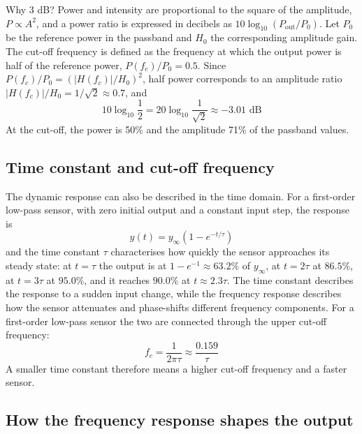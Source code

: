 \documentclass[letterpaper,11pt,leqno]{book}
\begin{document}
Why 3 dB? Power and intensity are proportional to the square of the amplitude, $P \propto A^2$, and a power ratio is expressed in decibels as $10\log_{10}(P_{\text{out}}/P_0)$. Let $P_0$ be the reference power in the passband and $H_0$ the corresponding amplitude gain. The cut-off frequency is defined as the frequency at which the output power is half of the reference power, $P(f_c)/P_0 = 0.5$. Since $P(f_c)/P_0 = (|H(f_c)|/H_0)^2$, half power corresponds to an amplitude ratio $|H(f_c)|/H_0 = 1/\sqrt{2} \approx 0.7$, and
\begin{equation}
\boxed{10\log_{10}\frac{1}{2} = 20\log_{10}\frac{1}{\sqrt{2}} \approx -3.01\text{ dB}}
\label{eq:minus_3db_derivation}
\end{equation}
At the cut-off, the power is 50\% and the amplitude 71\% of the passband values.

\subsection{Time constant and cut-off frequency}

The dynamic response can also be described in the time domain. For a first-order low-pass sensor, with zero initial output and a constant input step, the response is
\begin{equation}
\boxed{y(t) = y_\infty\left(1 - e^{-t/\tau}\right)}
\label{eq:step_response_yinf}
\end{equation}
and the time constant $\tau$ characterises how quickly the sensor approaches its steady state: at $t = \tau$ the output is at $1 - e^{-1} \approx 63.2\%$ of $y_\infty$, at $t = 2\tau$ at $86.5\%$, at $t = 3\tau$ at $95.0\%$, and it reaches $90.0\%$ at $t \approx 2.3\tau$. The time constant describes the response to a sudden input change, while the frequency response describes how the sensor attenuates and phase-shifts different frequency components. For a first-order low-pass sensor the two are connected through the upper cut-off frequency:
\begin{equation}
\boxed{f_c = \frac{1}{2\pi\tau} \approx \frac{0.159}{\tau}}
\label{eq:cutoff_tau}
\end{equation}
A smaller time constant therefore means a higher cut-off frequency and a faster sensor.

\subsection{How the frequency response shapes the output}
\label{sec:dynamic_error}
\end{document}
